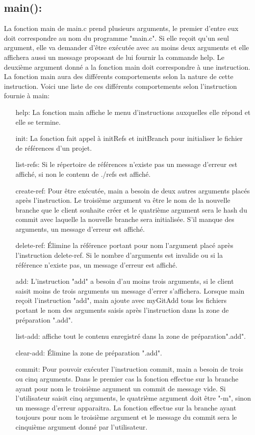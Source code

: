 \documentclass[11pt,francais]{article}
\begin{document}
\subsection{main():}  La fonction main de main.c prend plusieurs arguments, le premier d'entre eux doit correspondre au nom du programme "main.c". Si elle reçoit qu'un seul argument, elle va demander d'être exécutée avec au moins deux arguments et elle affichera aussi un message proposant de lui fournir la commande help. Le deuxième argument donné a la fonction main doit correspondre à une instruction. La fonction main aura des différents comportements selon la nature de cette instruction. Voici une liste de ces différents comportements selon l'instruction fournie à main:
\begin{itemize}
\item[help:] La fonction main affiche le menu d'instructions auxquelles elle répond et elle se termine.
\item[init:] La fonction fait appel à initRefs et initBranch pour initialiser le fichier de références d'un projet.
\item[list-refs:] Si le répertoire de références n'existe pas un message d'erreur est affiché, si non le contenu de ./refs est affiché.
\item[create-ref:] Pour être exécutée, main a besoin de deux autres arguments placés après l'instruction. Le troisième argument va être le nom de la nouvelle branche que le client souhaite créer et le quatrième argument sera le hash du commit avec laquelle la nouvelle branche sera initialisée. S'il manque des arguments, un message d'erreur est affiché.
\item[delete-ref:] Élimine la référence portant pour nom l'argument placé après l'instruction delete-ref. Si le nombre d'arguments est invalide ou si la référence n'existe pas, un message d'erreur est affiché.
\item[add:] L'instruction "add" a besoin d'au moins trois arguments, si le client saisit moins de trois arguments un message d'errer s'affichera.  Lorsque main reçoit l'instruction "add", main ajoute avec myGitAdd tous les fichiers portant le nom des arguments saisis après l'instruction dans la zone de préparation ".add".
\item[list-add:] affiche tout le contenu enregistré dans la zone de préparation".add".
\item[clear-add:] Élimine la zone de préparation ".add".
\item[commit:] Pour pouvoir exécuter l'instruction commit, main a besoin de trois ou cinq arguments. Dans le premier cas la fonction effectue sur la branche ayant pour nom le troisième argument un commit de message vide.  Si l'utilisateur saisit cinq arguments, le quatrième argument doit être "-m", sinon un message d'erreur apparaitra. La fonction effectue sur la branche ayant toujours pour nom le troisième argument et le message du commit sera le cinquième argument donné par l'utilisateur.

\end{itemize}
\end{document}
